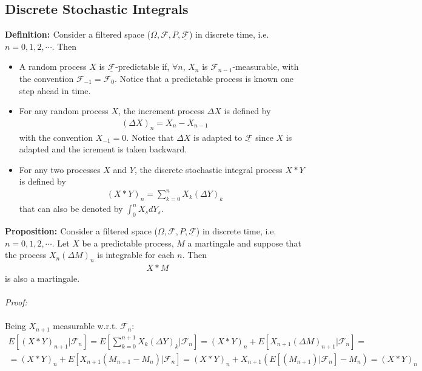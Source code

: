 \documentclass[a4paper,10pt]{report}
\theoremstyle{plain}
\theoremstyle{definition}
\newcommand\be{\begin{eqnarray}}    %
\newcommand\ee{\end{eqnarray}}
\newcommand{\DEF} {{\bf{Definition: }}}
\newcommand{\PROP} {{\bf{Proposition: }}}
\newcommand{\PROOF} {{\emph{Proof: \\ \\}}}
\newcommand{\FF} {\mathcal{F} }
\newcommand{\FLT} {\underline{\mathcal{F}}}
\begin{document}
\subsection{Discrete Stochastic Integrals}
\DEF Consider a filtered space ($\Omega, \FF, P, \FLT$) in discrete time, i.e. $n=0,1,2,\cdots$. Then
\begin{itemize}
\item A random process $X$ is $\FLT$-predictable if, $\forall n$, $X_n$ is $\FF_{n-1}$-measurable, with the convention $\FF_{-1}=\FF_0$. Notice that a predictable process is known one step ahead in time.
\item For any random process $X$, the increment process $\Delta X$ is defined by
\be 
(\Delta X)_n=X_n-X_{n-1}
\ee 
with the convention $X_{-1}=0$. Notice that $\Delta X$ is adapted to $\FLT$ since $X$ is adapted and the icrement is taken backward.
\item For any two processes $X$ and $Y$, the discrete stochastic integral process $X*Y$ is defined by
\be 
(X*Y)_n=\sum_{k=0}^n X_k (\Delta Y)_k
\ee
that can also be denoted by $\int_0^n X_s dY_s$.
\end{itemize}
\PROP Consider a filtered space ($\Omega, \FF, P, \FLT$) in discrete time, i.e. $n=0,1,2,\cdots$. Let $X$ be a predictable process, $M$ a martingale and suppose that the process $X_n(\Delta M)_n$ is integrable for each $n$. Then 
\be 
X*M
\label{martix}
\ee 
is also a martingale.\\ \\
\PROOF
Being $X_{n+1}$ measurable w.r.t. $\FF_n$:
\be
E[ (X*Y)_{n+1}|\FF_n]=E\left[ \sum_{k=0}^{n+1} X_k (\Delta Y)_k|\FF_n\right]=(X*Y)_{n}+E[X_{n+1}(\Delta M)_{n+1}|\FF_n]=\nonumber\\
=(X*Y)_{n}+E[X_{n+1}(M_{n+1}-M_n)|\FF_n]=(X*Y)_{n}+X_{n+1} \left(E[(M_{n+1})|\FF_n]-M_n\right)=(X*Y)_{n}\nonumber
\ee
\end{document}

